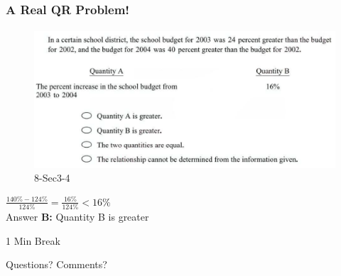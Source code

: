 \documentclass[
	11pt, %
	handout,
]{beamer}
\begin{document}
\begin{frame}
	\frametitle{A Real QR Problem!}
	\framesubtitle{}
	\begin{figure}
		\includegraphics[width=\linewidth]{Percent_Increase_Example_Question1.png}
		\caption{8-Sec3-4}
	\end{figure}
	\pause
$\frac{140\% - 124\%}{124\%} = \frac{16\%}{124\%} < 16\% $ \\
\pause
\bigskip
Answer \textbf{B: } Quantity B is greater
\end{frame}



\begin{frame}[plain] %
	\begin{center}
		{\Huge 1 Min Break}
		\bigskip\bigskip %
		
		{\LARGE Questions? Comments?}
	\end{center}
\end{frame}

\end{document}
